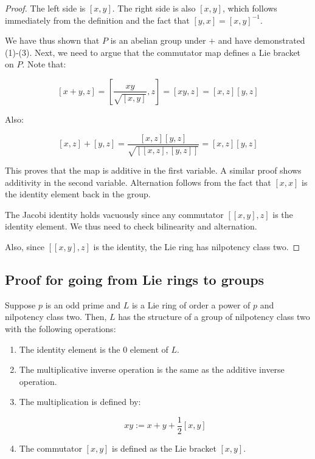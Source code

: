 \documentclass[10pt]{amsart}
\begin{document}
\begin{proof}
  The left side is $[x,y]$. The right side is also $[x,y]$, which
  follows immediately from the definition and the fact that $[y,x] =
  [x,y]^{-1}$.

  We have thus shown that $P$ is an abelian group under $+$ and have
  demonstrated (1)-(3). Next, we need to argue that the commutator map
  defines a Lie bracket on $P$.
  Note that:

  $$[x+y,z] = [\frac{xy}{\sqrt{[x,y]}},z] = [xy,z] = [x,z][y,z]$$
  
  Also:

  $$[x,z] + [y,z] = \frac{[x,z][y,z]}{\sqrt{[[x,z],[y,z]]}} = [x,z][y,z]$$

  This proves that the map is additive in the first variable. A similar
  proof shows additivity in the second variable. Alternation follows
  from the fact that $[x,x]$ is the identity element back in the
  group.

  The Jacobi identity holds vacuously since any commutator
  $[[x,y],z]$ is the identity element. We thus need to check
  bilinearity and alternation.

  Also, since $[[x,y],z]$ is the identity, the Lie ring has nilpotency
  class two.
\end{proof}

\subsection{Proof for going from Lie rings to groups}

\begin{theorem}
  Suppose $p$ is an odd prime and $L$ is a Lie ring of order a power
  of $p$ and nilpotency class two. Then, $L$ has the structure of a
  group of nilpotency class two with the following operations:

  \begin{enumerate}
  \item The identity element is the $0$ element of $L$.
  \item The multiplicative inverse operation is the same as the
    additive inverse operation.
  \item The multiplication is defined by:

    $$xy := x + y + \frac{1}{2}[x,y]$$

  \item The commutator $[x,y]$ is defined as the Lie bracket $[x,y]$.
  \end{enumerate}
\end{theorem}
\end{document}
